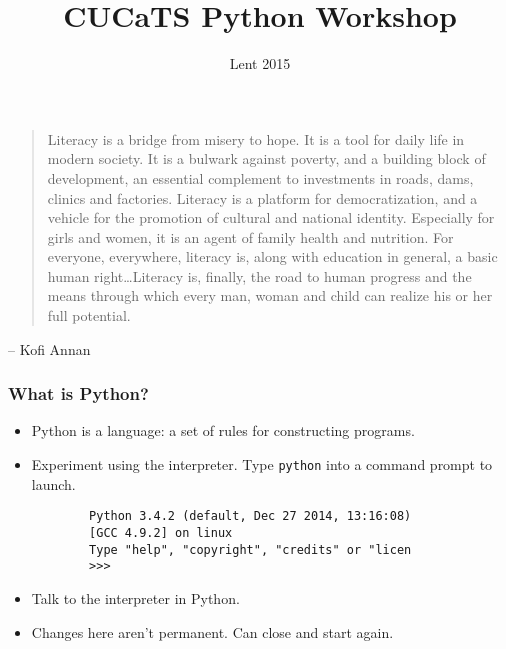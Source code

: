 \documentclass[notes]{beamer}
\title{CUCaTS Python Workshop}
\date{Lent 2015}
\begin{document}
\begin{frame}[fragile]
    \maketitle
\end{frame}

\begin{frame}[fragile]
    \begin{quotation}
        Literacy is a bridge from misery to hope. It is a tool for daily life in modern society. It is a bulwark against poverty, and a building block of development, an essential complement to investments in roads, dams, clinics and factories. Literacy is a platform for democratization, and a vehicle for the promotion of cultural and national identity. Especially for girls and women, it is an agent of family health and nutrition. For everyone, everywhere, literacy is, along with education in general, a basic human right\dots Literacy is, finally, the road to human progress and the means through which every man, woman and child can realize his or her full potential.
    \end{quotation}
\hfill  -- Kofi Annan
\end{frame}

\begin{frame}[fragile]
    \frametitle{What is Python?}
    \begin{itemize}
        \item Python is a language: a set of rules for constructing programs.
        \pause
        \item Experiment using the interpreter. Type \lstinline|python| into a command prompt to launch.
        \pause
        \begin{lstlisting}
        Python 3.4.2 (default, Dec 27 2014, 13:16:08)
        [GCC 4.9.2] on linux
        Type "help", "copyright", "credits" or "licen
        >>>
        \end{lstlisting}
        \pause
        \item Talk to the interpreter in Python.
        \pause
        \item Changes here aren't permanent. Can close and start again.
    \end{itemize}
\end{frame}
\end{document}
